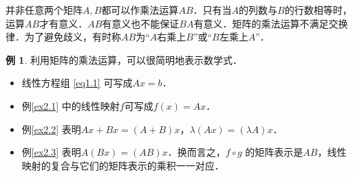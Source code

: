 \documentclass[a4paper,fontset=windows]{ctexbook}
\theoremstyle{definition}
\newtheorem{example}{例}[chapter]
\begin{document}
并非任意两个矩阵$A,B$都可以作乘法运算$AB$．只有当$A$的列数与$B$的行数相等时，运算$AB$才有意义．$AB$有意义也不能保证$BA$有意义．矩阵的乘法运算不满足交换律．为了避免歧义，有时称$AB$为“$A$右乘上$B$”或“$B$左乘上$A$”．

\begin{example}
利用矩阵的乘法运算，可以很简明地表示数学式．
\begin{itemize}
\item 线性方程组 \eqref{eq1.1} 可写成$Ax=b$．
\item 例\ref{ex2.1} 中的线性映射$f$可写成$f(x)=Ax$．
\item 例\ref{ex2.2} 表明$Ax+Bx=(A+B)x$，$\lambda(Ax)=(\lambda A)x$．
\item 例\ref{ex2.3} 表明$A(Bx)=(AB)x$．换而言之，$f\circ g$ 的矩阵表示是$AB$，线性映射的复合与它们的矩阵表示的乘积一一对应．
\end{itemize}
\end{example}
\end{document}
